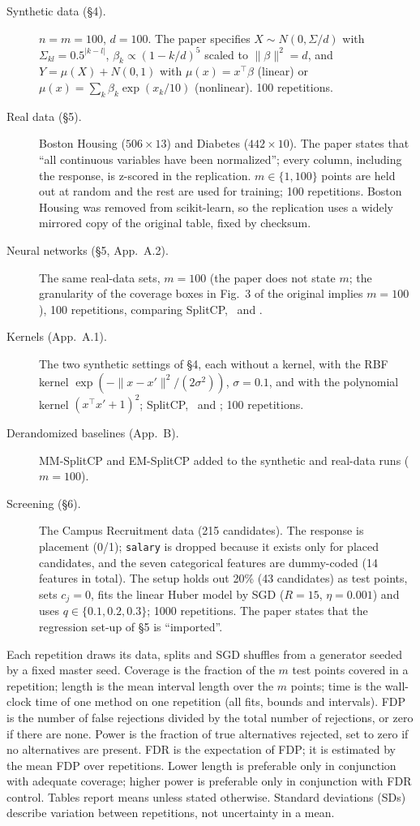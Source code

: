 \begin{description}
\item[Synthetic data (§4).] $n=m=100$, $d=100$. The paper specifies $X\sim N(0,\Sigma/d)$ with
  $\Sigma_{kl}=0.5^{|k-l|}$, $\beta_k\propto(1-k/d)^5$ scaled to $\|\beta\|^2=d$, and $Y=\mu(X)+N(0,1)$ with
  $\mu(x)=x^\top\beta$ (linear) or $\mu(x)=\sum_k\beta_k\exp(x_k/10)$ (nonlinear). 100 repetitions.
\item[Real data (§5).] Boston Housing\supercite{harrison1978hedonic} ($506\times13$) and
  Diabetes\supercite{efron2004least} ($442\times10$). The paper states that ``all continuous variables have been
  normalized''; every column, including the response, is z-scored in the replication. $m\in\{1,100\}$ points are held out at random and
  the rest are used for training; 100 repetitions. Boston Housing was removed from scikit-learn, so the replication uses a widely
  mirrored copy of the original table, fixed by checksum.
\item[Neural networks (§5, App.~A.2).] The same real-data sets, $m=100$ (the paper does not state $m$; the
  granularity of the coverage boxes in Fig.~3 of the original implies $m=100$), 100 repetitions, comparing SplitCP,
  \RO\ and \LOO.
\item[Kernels (App.~A.1).] The two synthetic settings of §4, each without a kernel, with the RBF kernel
  $\exp(-\|x-x'\|^2/(2\sigma^2))$, $\sigma=0.1$, and with the polynomial kernel $(x^\top x'+1)^2$; SplitCP, \RO\
  and \LOO; 100 repetitions.
\item[Derandomized baselines (App.~B).] MM-SplitCP and EM-SplitCP added to the synthetic and real-data runs
  ($m=100$).
\item[Screening (§6).] The Campus Recruitment data\supercite{roshan2020placement} (215 candidates). The response is
  placement (0/1); \texttt{salary} is dropped because it exists only for placed candidates, and the seven categorical
  features are dummy-coded (14 features in total). The setup holds out 20\% (43 candidates) as test points, sets $c_j=0$, fits
  the linear Huber model by SGD ($R=15$, $\eta=0.001$) and uses $q\in\{0.1,0.2,0.3\}$; 1000 repetitions. The paper
  states that the regression set-up of §5 is ``imported''.
\end{description}

Each repetition draws its data, splits and SGD shuffles from a generator seeded by a fixed master seed. Coverage is
the fraction of the $m$ test points covered in a repetition; length is the mean interval length over the $m$ points;
time is the wall-clock time of one method on one repetition (all fits, bounds and intervals). FDP is the number of false rejections divided by the total number of rejections, or zero if there are none. Power is the fraction of true alternatives rejected, set to zero if no alternatives are present. FDR is the expectation of FDP; it is estimated by the mean FDP over repetitions. Lower length is preferable only in conjunction with adequate coverage; higher power is preferable only in conjunction with FDR control. Tables report means unless stated otherwise. Standard deviations (SDs) describe variation between repetitions, not uncertainty in a mean.

